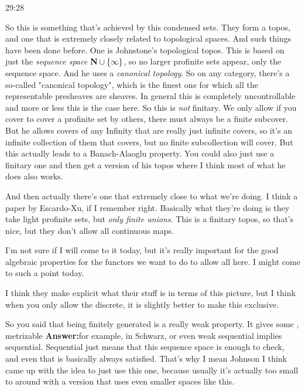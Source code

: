 \begin{example}
\begin{unfinished}{29:28}
\begin{remark}
\begin{remark}

So this is something that's achieved by this condensed sets. They form a topos, and one that is extremely closely related to topological spaces. And such things have been done before. One is Johnstone's topological topos. This is based on just the \emph{sequence space} $\mathbf N \cup \{\infty\}$, so no larger profinite sets appear, only the sequence space.
And he uses a \emph{canonical topology}. So on any category, there's a so-called "canonical topology", which is the finest one for which all the representable presheaves are sheaves. %
In general this is completely uncontrollable and more or less this is the case here. So this is \emph{not} finitary. We only allow if you cover to cover a  profinite set by others, there must always be a finite subcover. But he allows covers of any 
Infinity that are really just infinite covers, so it's an infinite collection of them that covers, but no finite subcollection will cover. But this actually leads to a Banach-Alaoglu property.
You could also just use a finitary one and then get a version of his topos where I think most of what he does also works. 

And then actually there's one that extremely close to what we're doing. I think a paper by Escardo-Xu, if I remember right. Basically what they're doing is they take light profinite sets, but \emph{only finite unions}. This is a finitary topos, so that's nice, but they don't allow all continuous maps.

I'm not sure if I will come to it today, but it's really important for the good algebraic properties for the functors we want to do to allow all here. I might come to such a point today.

I think they make explicit what their stuff is in terms of this picture, but I think when you only allow the discrete, it is slightly better to make this exclusive.

So you said that being finitely generated is a really weak property. It gives some , 
metrizable
\textbf{Answer:}for example, in Schwarz, or even weak sequential implies sequential. Sequential just means that this sequence space is enough to check, and even that is basically always satisfied. That's why I mean Johnson I think came up with the idea to just use this one, because usually it's actually too small to around with a version that uses even smaller spaces like this.


\end{remark}
\end{remark}
\end{unfinished}
\end{example}
